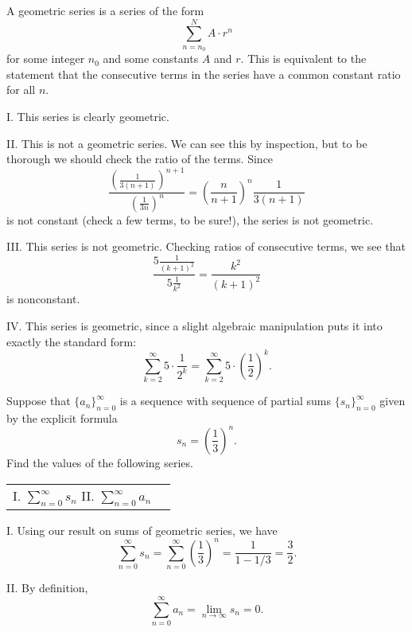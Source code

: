 \documentclass[noauthor, handout]{ximera}
\begin{document}
\begin{freeResponse}
A geometric series is a series of the form
$$
\sum_{n=n_0}^N A \cdot r^n
$$
for some integer $n_0$ and some constants $A$ and $r$. This is equivalent to the statement that the consecutive terms in the series have a common constant ratio for all $n$. 

I. This series is clearly geometric.

II. This is not a geometric series. We can see this by inspection, but to be thorough we should check the ratio of the terms. Since
$$
\frac{\left(\frac{1}{3(n+1)}\right)^{n+1}}{\left(\frac{1}{3n}\right)^n} = \left(\frac{n}{n+1}\right)^n \frac{1}{3(n+1)}
$$
is not constant (check a few terms, to be sure!), the series is not geometric.

III. This series is not geometric. Checking ratios of consecutive terms, we see that
$$
\frac{5 \frac{1}{(k+1)^2}}{ 5 \frac{1}{k^2}} = \frac{k^2}{(k+1)^2}
$$
is nonconstant.

IV. This series is geometric, since a slight algebraic manipulation puts it into exactly the standard form:
$$
\sum_{k=2}^\infty 5 \cdot \frac{1}{2^k} = \sum_{k=2}^\infty 5 \cdot \left(\frac{1}{2}\right)^k.
$$
\end{freeResponse}


\begin{problem}
Suppose that $\{a_n\}_{n=0}^\infty$ is a sequence with sequence of partial sums $\{s_n\}_{n=0}^\infty$ given by the explicit formula
$$
s_n = \left(\frac{1}{3}\right)^n.
$$
Find the values of the following series.
\begin{center}
\begin{tabular}{ll}
I. $\sum_{n=0}^\infty s_n$ \hspace{.6in} II. $\sum_{n=0}^\infty a_n$
\end{tabular}
\end{center}
\end{problem}

\begin{freeResponse}
I. Using our result on sums of geometric series, we have
$$
\sum_{n=0}^\infty s_n = \sum_{n=0}^\infty \left(\frac{1}{3}\right)^n = \frac{1}{1-1/3} = \frac{3}{2}.
$$

II. By definition,
$$
\sum_{n=0}^\infty a_n = \lim_{n \rightarrow \infty} s_n = 0.
$$
\end{freeResponse}

\end{document}
